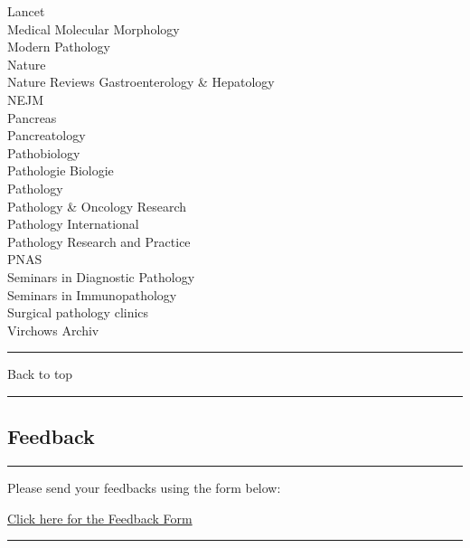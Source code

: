 \documentclass[]{article}
\begin{document}
Lancet\\
Medical Molecular Morphology\\
Modern Pathology\\
Nature\\
Nature Reviews Gastroenterology \& Hepatology\\
NEJM\\
Pancreas\\
Pancreatology\\
Pathobiology\\
Pathologie Biologie\\
Pathology\\
Pathology \& Oncology Research\\
Pathology International\\
Pathology Research and Practice\\
PNAS\\
Seminars in Diagnostic Pathology\\
Seminars in Immunopathology\\
Surgical pathology clinics\\
Virchows Archiv

\begin{center}\rule{0.5\linewidth}{\linethickness}\end{center}

Back to top

\begin{center}\rule{0.5\linewidth}{\linethickness}\end{center}

\pagebreak

\hypertarget{feedback}{%
\subsection{Feedback}\label{feedback}}

\begin{center}\rule{0.5\linewidth}{\linethickness}\end{center}

Please send your feedbacks using the form below:

\href{https://docs.google.com/forms/d/e/1FAIpQLSeD3Z9J6Y7eMmiyM12f_SfAmHUlykb1zxZcwO6lg7cebGYQIQ/viewform}{Click
here for the Feedback Form}

\begin{center}\rule{0.5\linewidth}{\linethickness}\end{center}

\hypertarget{disqus_thread}{}
\end{document}
